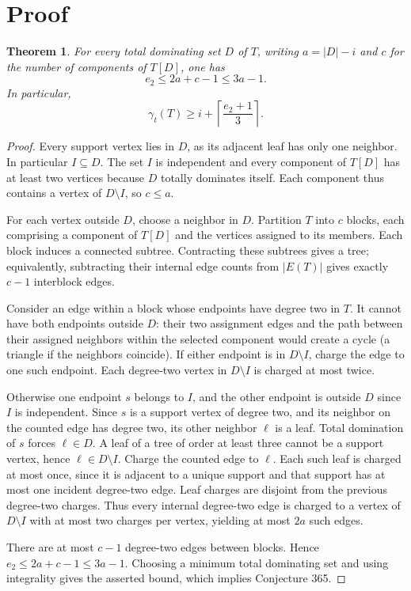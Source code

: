 \documentclass[11pt]{article}
\newtheorem{theorem}{Theorem}
\begin{document}
\section{Proof}
\begin{theorem}
For every total dominating set $D$ of $T$, writing $a=|D|-i$ and $c$ for the number of components of $T[D]$, one has
\[
 e_2\le 2a+c-1\le 3a-1.
\]
In particular,
\[
 \gamma_t(T)\ge i+\left\lceil\frac{e_2+1}{3}\right\rceil.
\]
\end{theorem}
\begin{proof}
Every support vertex lies in $D$, as its adjacent leaf has only one neighbor. In particular $I\subseteq D$. The set $I$ is independent and every component of $T[D]$ has at least two vertices because $D$ totally dominates itself. Each component thus contains a vertex of $D\setminus I$, so $c\le a$.

For each vertex outside $D$, choose a neighbor in $D$. Partition $T$ into $c$ blocks, each comprising a component of $T[D]$ and the vertices assigned to its members. Each block induces a connected subtree. Contracting these subtrees gives a tree; equivalently, subtracting their internal edge counts from $|E(T)|$ gives exactly $c-1$ interblock edges.

Consider an edge within a block whose endpoints have degree two in $T$. It cannot have both endpoints outside $D$: their two assignment edges and the path between their assigned neighbors within the selected component would create a cycle (a triangle if the neighbors coincide). If either endpoint is in $D\setminus I$, charge the edge to one such endpoint. Each degree-two vertex in $D\setminus I$ is charged at most twice.

Otherwise one endpoint $s$ belongs to $I$, and the other endpoint is outside $D$ since $I$ is independent. Since $s$ is a support vertex of degree two, and its neighbor on the counted edge has degree two, its other neighbor $\ell$ is a leaf. Total domination of $s$ forces $\ell\in D$. A leaf of a tree of order at least three cannot be a support vertex, hence $\ell\in D\setminus I$. Charge the counted edge to $\ell$. Each such leaf is charged at most once, since it is adjacent to a unique support and that support has at most one incident degree-two edge. Leaf charges are disjoint from the previous degree-two charges. Thus every internal degree-two edge is charged to a vertex of $D\setminus I$ with at most two charges per vertex, yielding at most $2a$ such edges.

There are at most $c-1$ degree-two edges between blocks. Hence $e_2\le2a+c-1\le3a-1$. Choosing a minimum total dominating set and using integrality gives the asserted bound, which implies Conjecture 365.
\end{proof}
\end{document}
